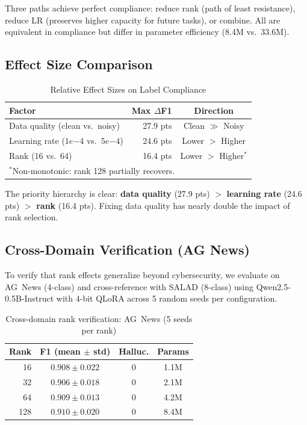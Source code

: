 \documentclass[journal]{IEEEtran}
\begin{document}
Three paths achieve perfect compliance: reduce rank (path of least resistance), reduce LR (preserves higher capacity for future tasks), or combine. All are equivalent in compliance but differ in parameter efficiency (8.4M vs.\ 33.6M).

\subsection{Effect Size Comparison}

\begin{table}[!ht]
\centering
\caption{Relative Effect Sizes on Label Compliance}
\label{tab:effects}
\begin{tabular}{lrc}
\toprule
\textbf{Factor} & \textbf{Max $\Delta$F1} & \textbf{Direction} \\
\midrule
Data quality (clean vs.\ noisy) & 27.9 pts & Clean $\gg$ Noisy \\
Learning rate ($1e{-4}$ vs.\ $5e{-4}$) & 24.6 pts & Lower $>$ Higher \\
Rank (16 vs.\ 64) & 16.4 pts & Lower $>$ Higher$^*$ \\
\bottomrule
\multicolumn{3}{l}{\scriptsize $^*$Non-monotonic: rank 128 partially recovers.}
\end{tabular}
\end{table}

The priority hierarchy is clear: \textbf{data quality} (27.9 pts) $>$ \textbf{learning rate} (24.6 pts) $>$ \textbf{rank} (16.4 pts). Fixing data quality has nearly double the impact of rank selection.


\subsection{Cross-Domain Verification (AG News)}

To verify that rank effects generalize beyond cybersecurity, we evaluate on AG~News (4-class) and cross-reference with SALAD (8-class) using Qwen2.5-0.5B-Instruct with 4-bit QLoRA across 5 random seeds per configuration.

\begin{table}[!ht]
\centering
\caption{Cross-domain rank verification: AG~News (5 seeds per rank)}
\label{tab:cross-domain}
\begin{tabular}{rccc}
\toprule
\textbf{Rank} & \textbf{F1 (mean $\pm$ std)} & \textbf{Halluc.} & \textbf{Params} \\
\midrule
16 & $0.908 \pm 0.022$ & 0 & 1.1M \\
32 & $0.906 \pm 0.018$ & 0 & 2.1M \\
64 & $0.909 \pm 0.013$ & 0 & 4.2M \\
128 & $0.910 \pm 0.020$ & 0 & 8.4M \\
\bottomrule
\end{tabular}
\end{table}
\end{document}
